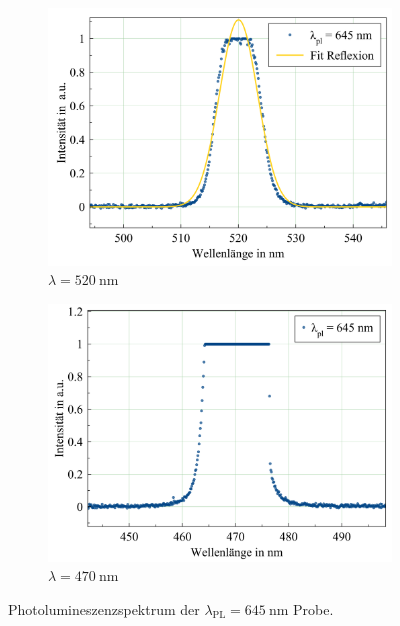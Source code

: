 \begin{figure}[H]
  \centering
  \begin{subfigure}{0.49\textwidth}
    \includegraphics[width=\textwidth]{plots/Weisslicht_645_520.png}
    \caption{$\lambda=\SI{520}{\nano\meter}$}
  \end{subfigure}
  \begin{subfigure}{0.49\textwidth}
    \includegraphics[width=\textwidth]{plots/Weisslicht_645_470.png}
    \caption{$\lambda=\SI{470}{\nano\meter}$}
  \end{subfigure}
  \caption{Photolumineszenzspektrum der $\lambda_{\text{PL}}=\SI{645}{\nano\meter}$ Probe.}
  \label{fig:PL_645}
\end{figure}
